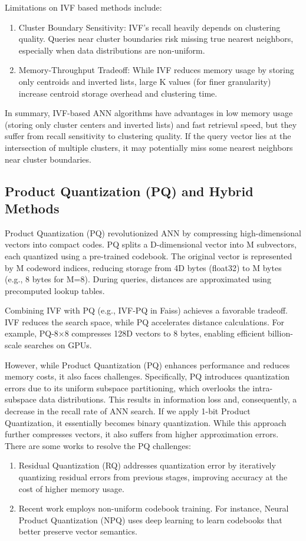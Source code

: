 \documentclass[sigconf, nonacm]{acmart}
\begin{document}
Limitations on IVF based methods include:

\begin{enumerate}
    \item Cluster Boundary Sensitivity: IVF’s recall heavily depends on clustering quality. Queries near cluster boundaries risk missing true nearest neighbors, especially when data distributions are non-uniform. 
    \item Memory-Throughput Tradeoff: While IVF reduces memory usage by storing only centroids and inverted lists, large K values (for finer granularity) increase centroid storage overhead and clustering time.
\end{enumerate}

In summary, IVF-based ANN algorithms have advantages in low memory usage (storing only cluster centers and inverted lists) and fast retrieval speed, but they suffer from recall sensitivity to clustering quality. If the query vector lies at the intersection of multiple clusters, it may potentially miss some nearest neighbors near cluster boundaries.

\subsection{Product Quantization (PQ) and Hybrid Methods}
Product Quantization (PQ) \cite{johnson2019billion} revolutionized ANN by compressing high-dimensional vectors into compact codes. PQ splits a D-dimensional vector into M subvectors, each quantized using a pre-trained codebook. The original vector is represented by M codeword indices, reducing storage from 4D bytes (float32) to M bytes (e.g., 8 bytes for M=8). During queries, distances are approximated using precomputed lookup tables.

Combining IVF with PQ (e.g., IVF-PQ in Faiss) achieves a favorable tradeoff. IVF reduces the search space, while PQ accelerates distance calculations. For example, PQ-8×8 compresses 128D vectors to 8 bytes, enabling efficient billion-scale searches on GPUs.

However, while Product Quantization (PQ) enhances performance and reduces memory costs, it also faces challenges. Specifically, PQ introduces quantization errors due to its uniform subspace partitioning, which overlooks the intra-subspace data distributions. This results in information loss and, consequently, a decrease in the recall rate of ANN search. If we apply 1-bit Product Quantization, it essentially becomes binary quantization. While this approach further compresses vectors, it also suffers from higher approximation errors. There are some works to resolve the PQ challenges:
\begin{enumerate}
    \item Residual Quantization (RQ)\cite{aguerrebere2023similarity} addresses quantization error by iteratively quantizing residual errors from previous stages, improving accuracy at the cost of higher memory usage.
    \item Recent work employs non-uniform codebook training. For instance, Neural Product Quantization (NPQ) \cite{guo2020accelerating} uses deep learning to learn codebooks that better preserve vector semantics.
\end{enumerate}
\end{document}
